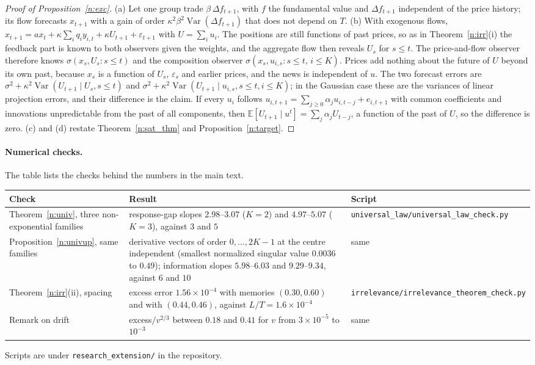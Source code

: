 \begin{proof}[Proof of Proposition~\ref{n:exc}]
(a) Let one group trade $\beta\,\Delta f_{t+1}$, with $f$ the fundamental value and $\Delta f_{t+1}$ independent of the price history; its flow forecasts $x_{t+1}$ with a gain of order $\kappa^2\beta^2\operatorname{Var}(\Delta f_{t+1})$ that does not depend on $T$. (b) With exogenous flows, $x_{t+1}=ax_t+\kappa\sum_iq_iy_{i,t}+\kappa U_{t+1}+\varepsilon_{t+1}$ with $U=\sum_iu_i$. The positions are still functions of past prices, so as in Theorem~\ref{n:irr}(i) the feedback part is known to both observers given the weights, and the aggregate flow then reveals $U_s$ for $s\le t$. The price-and-flow observer therefore knows $\sigma(x_s,U_s:s\le t)$ and the composition observer $\sigma(x_s,u_{i,s}:s\le t,\,i\le K)$. Prices add nothing about the future of $U$ beyond its own past, because $x_s$ is a function of $U_s$, $\varepsilon_s$ and earlier prices, and the news is independent of $u$. The two forecast errors are $\sigma^2+\kappa^2\operatorname{Var}(U_{t+1}\mid U_s,s\le t)$ and $\sigma^2+\kappa^2\operatorname{Var}(U_{t+1}\mid u_{i,s},s\le t,i\le K)$; in the Gaussian case these are the variances of linear projection errors, and their difference is the claim. If every $u_i$ follows $u_{i,t+1}=\sum_{j\ge0}\alpha_ju_{i,t-j}+e_{i,t+1}$ with common coefficients and innovations unpredictable from the past of all components, then $\mathbb E[U_{t+1}\mid u^t]=\sum_j\alpha_jU_{t-j}$, a function of the past of $U$, so the difference is zero. (c) and (d) restate Theorem~\ref{n:sat_thm} and Proposition~\ref{n:target}.
\end{proof}

\paragraph{Numerical checks.} The table lists the checks behind the numbers in the main text.

\begin{center}\small
\begin{tabular}{p{1.7in}p{2.6in}p{1.6in}}\toprule
Check & Result & Script \\\midrule
Theorem~\ref{n:univ}, three non-exponential families & response-gap slopes $2.98$--$3.07$ ($K=2$) and $4.97$--$5.07$ ($K=3$), against $3$ and $5$ & \nolinkurl{universal_law/universal_law_check.py}\\
Proposition~\ref{n:univup}, same families & derivative vectors of order $0,\ldots,2K-1$ at the centre independent (smallest normalized singular value $0.0036$ to $0.49$); information slopes $5.98$--$6.03$ and $9.29$--$9.34$, against $6$ and $10$ & same\\
Theorem~\ref{n:irr}(ii), spacing & excess error $1.56\times10^{-4}$ with memories $(0.30,0.60)$ and with $(0.44,0.46)$, against $L/T=1.6\times10^{-4}$ & \nolinkurl{irrelevance/irrelevance_theorem_check.py}\\
Remark on drift & excess$/v^{2/3}$ between $0.18$ and $0.41$ for $v$ from $3\times10^{-5}$ to $10^{-3}$ & same\\\bottomrule
\end{tabular}
\end{center}
\noindent Scripts are under \nolinkurl{research_extension/} in the repository.
